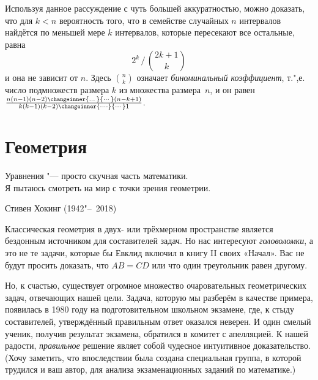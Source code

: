 \documentclass[twoside]{book}
\begin{document}
Используя данное рассуждение с чуть большей аккуратностью, можно доказать, что 
для $k < n$ вероятность того, что в семействе случайных $n$ интервалов найдётся по меньшей мере $k$ интервалов, которые пересекают все остальные, равна
\[{2^k}\,\big/\,{\binom{2k+1} k}\]
и она не зависит от $n$.
Здесь $\binom n k$ означает \emph{биноминальный коэффициент}, т.",е. число подмножеств размера $k$ из множества размера~$n$, и он равен $
\frac{n(n-1)(n-2)\changeinner{\dots}{\cdots}(n-k+1)}{k(k-1)(k-2)\changeinner{\dots\cdot}{\cdots} 1}$.





\chapter{Геометрия}

\setlength{\epigraphwidth}{.66\textwidth}
\epigraph{Уравнения "--- просто скучная часть математики.\\
Я пытаюсь смотреть на мир с точки зрения геометрии.\vspace{1ex}}{Стивен Хокинг (1942"--~2018)}

Классическая геометрия в двух- или трёхмерном пространстве является бездонным источником для составителей задач. 
Но нас интересуют \emph{головоломки}, а это не те задачи, которые бы Евклид включил в книгу II своих «Начал».
Вас не будут просить доказать, что $AB=CD$ или что один треугольник равен другому.

Но, к счастью, существует огромное множество очаровательных геометрических задач, отвечающих нашей цели. 
Задача, которую мы разберём в качестве примера, появилась в 1980 году на подготовительном  школьном экзамене, %
где, к стыду составителей, %
утверждённый правильным ответ оказался неверен.
И один смелый ученик, получив результат экзамена, обратился в комитет с апелляцией.
К нашей радости, \emph{правильное} решение являет собой  чудесное интуитивное доказательство.
(Хочу заметить, что впоследствии была создана специальная группа, в которой  трудился и ваш автор, для анализа экзаменационных заданий по математике.)
\end{document}
